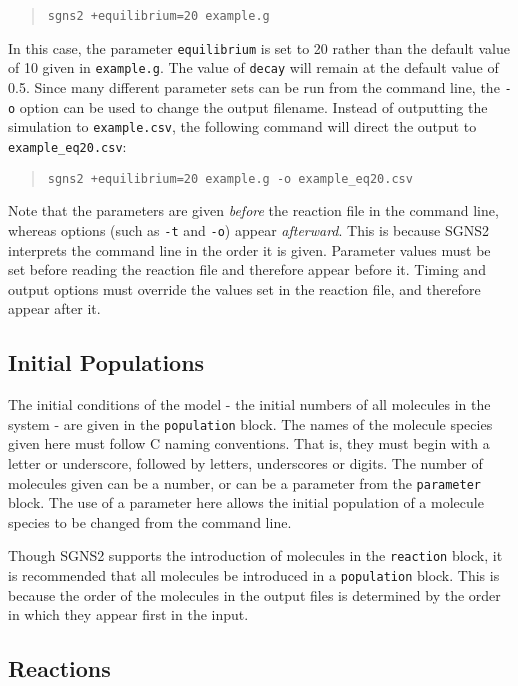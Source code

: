 \documentclass[10pt]{article}
\newcommand{\code}[1]{{\tt {#1}}}
\newcommand{\programname}{SGNS2}
\newcommand{\progexe}{sgns2}
\begin{document}
\begin{quote}
\code{\progexe\ +equilibrium=20 example.g}
\end{quote}

In this case, the parameter \code{equilibrium} is set to 20 rather than the default value of 10 given in \code{example.g}. The value of \code{decay} will remain at the default value of 0.5. Since many different parameter sets can be run from the command line, the \code{-o} option can be used to change the output filename. Instead of outputting the simulation to \code{example.csv}, the following command will direct the output to \code{example\_eq20.csv}:

\begin{quote}
\code{\progexe\ +equilibrium=20 example.g -o example\_eq20.csv}
\end{quote}

Note that the parameters are given \emph{before} the reaction file in the command line, whereas options (such as \code{-t} and \code{-o}) appear \emph{afterward}. This is because {\programname} interprets the command line in the order it is given. Parameter values must be set before reading the reaction file and therefore appear before it. Timing and output options must override the values set in the reaction file, and therefore appear after it.

\subsection{Initial Populations}

The initial conditions of the model - the initial numbers of all molecules in the system - are given in the \code{population} block. The names of the molecule species given here must follow C naming conventions. That is, they must begin with a letter or underscore, followed by letters, underscores or digits. The number of molecules given can be a number, or can be a parameter from the \code{parameter} block. The use of a parameter here allows the initial population of a molecule species to be changed from the command line.

Though {\programname} supports the introduction of molecules in the \code{reaction} block, it is recommended that all molecules be introduced in a \code{population} block. This is because the order of the molecules in the output files is determined by the order in which they appear first in the input.

\subsection{Reactions}
\end{document}
